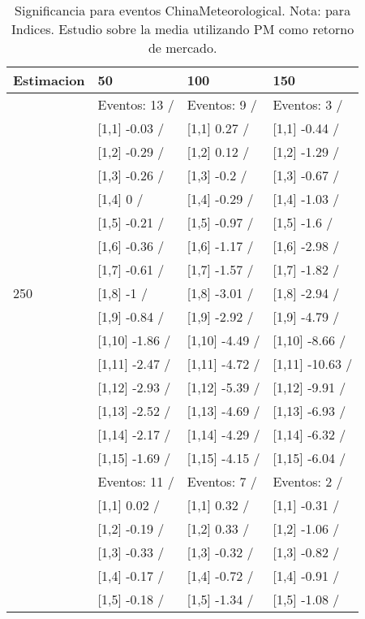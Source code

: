 \begin{table}

\caption{Significancia para eventos ChinaMeteorological. Nota: para Indices. Estudio sobre la media utilizando PM como retorno de mercado.}
\centering
\begin{tabular}[t]{llll}
\toprule
Estimacion & 50 & 100 & 150\\
\midrule
 & Eventos:  13 / & Eventos:  9 / & Eventos:  3 /\\
 & {}[1,1] -0.03  / & {}[1,1] 0.27  / & {}[1,1] -0.44  /\\
 & {}[1,2] -0.29  / & {}[1,2] 0.12  / & {}[1,2] -1.29  /\\
 & {}[1,3] -0.26  / & {}[1,3] -0.2  / & {}[1,3] -0.67  /\\
 & {}[1,4] 0  / & {}[1,4] -0.29  / & {}[1,4] -1.03  /\\
\addlinespace
 & {}[1,5] -0.21  / & {}[1,5] -0.97  / & {}[1,5] -1.6  /\\
 & {}[1,6] -0.36  / & {}[1,6] -1.17  / & {}[1,6] -2.98  /\\
 & {}[1,7] -0.61  / & {}[1,7] -1.57  / & {}[1,7] -1.82  /\\
250 & {}[1,8] -1  / & {}[1,8] -3.01  / & {}[1,8] -2.94  /\\
 & {}[1,9] -0.84  / & {}[1,9] -2.92  / & {}[1,9] -4.79  /\\
\addlinespace
 & {}[1,10] -1.86  / & {}[1,10] -4.49  / & {}[1,10] -8.66  /\\
 & {}[1,11] -2.47  / & {}[1,11] -4.72  / & {}[1,11] -10.63  /\\
 & {}[1,12] -2.93  / & {}[1,12] -5.39  / & {}[1,12] -9.91  /\\
 & {}[1,13] -2.52  / & {}[1,13] -4.69  / & {}[1,13] -6.93  /\\
 & {}[1,14] -2.17  / & {}[1,14] -4.29  / & {}[1,14] -6.32  /\\
\addlinespace
 & {}[1,15] -1.69  / & {}[1,15] -4.15  / & {}[1,15] -6.04  /\\
 & Eventos:  11 / & Eventos:  7 / & Eventos:  2 /\\
 & {}[1,1] 0.02  / & {}[1,1] 0.32  / & {}[1,1] -0.31  /\\
 & {}[1,2] -0.19  / & {}[1,2] 0.33  / & {}[1,2] -1.06  /\\
 & {}[1,3] -0.33  / & {}[1,3] -0.32  / & {}[1,3] -0.82  /\\
\addlinespace
 & {}[1,4] -0.17  / & {}[1,4] -0.72  / & {}[1,4] -0.91  /\\
 & {}[1,5] -0.18  / & {}[1,5] -1.34  / & {}[1,5] -1.08  /\\

\end{tabular}
\end{table}
